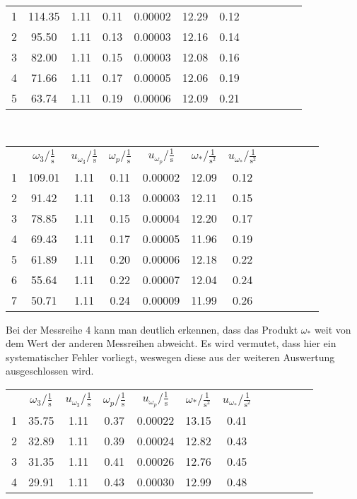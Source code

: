 \begin{center}
\begin{tabular}{gccccccccccc}
        1 &  114.35 &  1.11 &  0.11 &  0.00002 &  12.29 &  0.12 \\     
        2 &   95.50 &  1.11 &  0.13 &  0.00003 &  12.16 &  0.14 \\     
        3 &   82.00 &  1.11 &  0.15 &  0.00003 &  12.08 &  0.16 \\     
        4 &   71.66 &  1.11 &  0.17 &  0.00005 &  12.06 &  0.19 \\     
        5 &   63.74 &  1.11 &  0.19 &  0.00006 &  12.09 &  0.21 \\
    \end{tabular}\\
    \newpage
    \begin{tabular}{gccccccccccc}
         &      $\omega_3/\frac{1}{\text{s}}$ &  $u_{\omega_3}/\frac{1}{\text{s}}$ &    $\omega_p/\frac{1}{\text{s}}$ &     $u_{\omega_p}/\frac{1}{\text{s}}$ &     $\omega_*/\frac{1}{\text{s}^2}$&  $u_{\omega_*}/\frac{1}{\text{s}^2}$\\
        1 &  109.01 &  1.11 &  0.11 &  0.00002 &  12.09 &  0.12 \\     
        2 &   91.42 &  1.11 &  0.13 &  0.00003 &  12.11 &  0.15 \\     
        3 &   78.85 &  1.11 &  0.15 &  0.00004 &  12.20 &  0.17 \\     
        4 &   69.43 &  1.11 &  0.17 &  0.00005 &  11.96 &  0.19 \\     
        5 &   61.89 &  1.11 &  0.20 &  0.00006 &  12.18 &  0.22 \\     
        6 &   55.64 &  1.11 &  0.22 &  0.00007 &  12.04 &  0.24 \\      
        7 &   50.71 &  1.11 &  0.24 &  0.00009 &  11.99 &  0.26 \\ 
    \end{tabular}
\end{center}
Bei der Messreihe 4 kann man deutlich erkennen, dass das Produkt $\omega_*$ weit von dem Wert der anderen Messreihen abweicht. Es wird vermutet, dass hier ein systematischer Fehler vorliegt, weswegen diese aus der weiteren Auswertung ausgeschlossen wird. 
\begin{center}
    \begin{tabular}{gccccccccccc}
         &      $\omega_3/\frac{1}{\text{s}}$ &  $u_{\omega_3}/\frac{1}{\text{s}}$ &    $\omega_p/\frac{1}{\text{s}}$ &     $u_{\omega_p}/\frac{1}{\text{s}}$ &     $\omega_*/\frac{1}{\text{s}^2}$&  $u_{\omega_*}/\frac{1}{\text{s}^2}$\\
        1 &  35.75 &  1.11 &  0.37 &  0.00022 &  13.15 &  0.41 \\      
        2 &  32.89 &  1.11 &  0.39 &  0.00024 &  12.82 &  0.43 \\      
        3 &  31.35 &  1.11 &  0.41 &  0.00026 &  12.76 &  0.45 \\      
        4 &  29.91 &  1.11 &  0.43 &  0.00030 &  12.99 &  0.48 \\
    \end{tabular}
\end{center}
